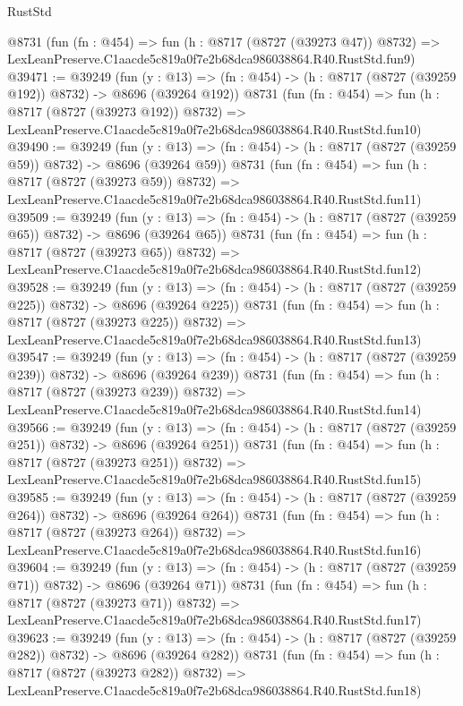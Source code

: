 \begin{lexlean}{RustStd}
\begin{coremodule}
    @8731
    (fun (fn : @454) =>
    fun (h : @8717 (@8727 (@39273 @47)) @8732) =>
    LexLeanPreserve.C1aacde5c819a0f7e2b68dca986038864.R40.RustStd.fun9)
@39471 := @39249
    (fun (y : @13) => (fn : @454) -> (h : @8717 (@8727 (@39259 @192)) @8732) -> @8696 (@39264 @192))
    @8731
    (fun (fn : @454) =>
    fun (h : @8717 (@8727 (@39273 @192)) @8732) =>
    LexLeanPreserve.C1aacde5c819a0f7e2b68dca986038864.R40.RustStd.fun10)
@39490 := @39249
    (fun (y : @13) => (fn : @454) -> (h : @8717 (@8727 (@39259 @59)) @8732) -> @8696 (@39264 @59))
    @8731
    (fun (fn : @454) =>
    fun (h : @8717 (@8727 (@39273 @59)) @8732) =>
    LexLeanPreserve.C1aacde5c819a0f7e2b68dca986038864.R40.RustStd.fun11)
@39509 := @39249
    (fun (y : @13) => (fn : @454) -> (h : @8717 (@8727 (@39259 @65)) @8732) -> @8696 (@39264 @65))
    @8731
    (fun (fn : @454) =>
    fun (h : @8717 (@8727 (@39273 @65)) @8732) =>
    LexLeanPreserve.C1aacde5c819a0f7e2b68dca986038864.R40.RustStd.fun12)
@39528 := @39249
    (fun (y : @13) => (fn : @454) -> (h : @8717 (@8727 (@39259 @225)) @8732) -> @8696 (@39264 @225))
    @8731
    (fun (fn : @454) =>
    fun (h : @8717 (@8727 (@39273 @225)) @8732) =>
    LexLeanPreserve.C1aacde5c819a0f7e2b68dca986038864.R40.RustStd.fun13)
@39547 := @39249
    (fun (y : @13) => (fn : @454) -> (h : @8717 (@8727 (@39259 @239)) @8732) -> @8696 (@39264 @239))
    @8731
    (fun (fn : @454) =>
    fun (h : @8717 (@8727 (@39273 @239)) @8732) =>
    LexLeanPreserve.C1aacde5c819a0f7e2b68dca986038864.R40.RustStd.fun14)
@39566 := @39249
    (fun (y : @13) => (fn : @454) -> (h : @8717 (@8727 (@39259 @251)) @8732) -> @8696 (@39264 @251))
    @8731
    (fun (fn : @454) =>
    fun (h : @8717 (@8727 (@39273 @251)) @8732) =>
    LexLeanPreserve.C1aacde5c819a0f7e2b68dca986038864.R40.RustStd.fun15)
@39585 := @39249
    (fun (y : @13) => (fn : @454) -> (h : @8717 (@8727 (@39259 @264)) @8732) -> @8696 (@39264 @264))
    @8731
    (fun (fn : @454) =>
    fun (h : @8717 (@8727 (@39273 @264)) @8732) =>
    LexLeanPreserve.C1aacde5c819a0f7e2b68dca986038864.R40.RustStd.fun16)
@39604 := @39249
    (fun (y : @13) => (fn : @454) -> (h : @8717 (@8727 (@39259 @71)) @8732) -> @8696 (@39264 @71))
    @8731
    (fun (fn : @454) =>
    fun (h : @8717 (@8727 (@39273 @71)) @8732) =>
    LexLeanPreserve.C1aacde5c819a0f7e2b68dca986038864.R40.RustStd.fun17)
@39623 := @39249
    (fun (y : @13) => (fn : @454) -> (h : @8717 (@8727 (@39259 @282)) @8732) -> @8696 (@39264 @282))
    @8731
    (fun (fn : @454) =>
    fun (h : @8717 (@8727 (@39273 @282)) @8732) =>
    LexLeanPreserve.C1aacde5c819a0f7e2b68dca986038864.R40.RustStd.fun18)

\end{coremodule}
\end{lexlean}
